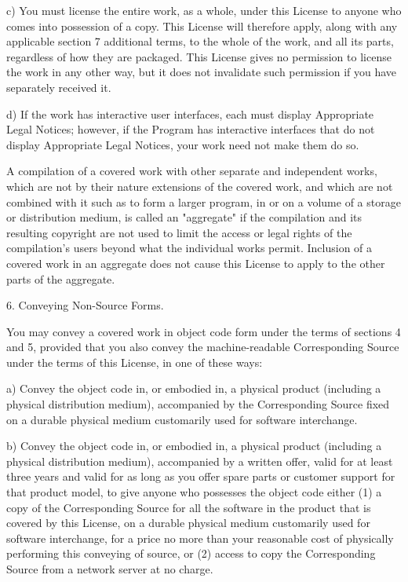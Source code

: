 \documentclass[parskip=half]{scrartcl}
\begin{document}
    c) You must license the entire work, as a whole, under this
    License to anyone who comes into possession of a copy.  This
    License will therefore apply, along with any applicable section 7
    additional terms, to the whole of the work, and all its parts,
    regardless of how they are packaged.  This License gives no
    permission to license the work in any other way, but it does not
    invalidate such permission if you have separately received it.

    d) If the work has interactive user interfaces, each must display
    Appropriate Legal Notices; however, if the Program has interactive
    interfaces that do not display Appropriate Legal Notices, your
    work need not make them do so.

  A compilation of a covered work with other separate and independent
works, which are not by their nature extensions of the covered work,
and which are not combined with it such as to form a larger program,
in or on a volume of a storage or distribution medium, is called an
"aggregate" if the compilation and its resulting copyright are not
used to limit the access or legal rights of the compilation's users
beyond what the individual works permit.  Inclusion of a covered work
in an aggregate does not cause this License to apply to the other
parts of the aggregate.

  6. Conveying Non-Source Forms.

  You may convey a covered work in object code form under the terms
of sections 4 and 5, provided that you also convey the
machine-readable Corresponding Source under the terms of this License,
in one of these ways:

    a) Convey the object code in, or embodied in, a physical product
    (including a physical distribution medium), accompanied by the
    Corresponding Source fixed on a durable physical medium
    customarily used for software interchange.

    b) Convey the object code in, or embodied in, a physical product
    (including a physical distribution medium), accompanied by a
    written offer, valid for at least three years and valid for as
    long as you offer spare parts or customer support for that product
    model, to give anyone who possesses the object code either (1) a
    copy of the Corresponding Source for all the software in the
    product that is covered by this License, on a durable physical
    medium customarily used for software interchange, for a price no
    more than your reasonable cost of physically performing this
    conveying of source, or (2) access to copy the
    Corresponding Source from a network server at no charge.
\end{document}
